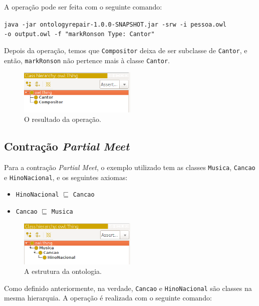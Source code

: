 A operação pode ser feita com o seguinte comando:

\begin{small}
	\texttt{java -jar ontologyrepair-1.0.0-SNAPSHOT.jar -srw -i pessoa.owl \\ -o output.owl -f "markRonson Type: Cantor"}
\end{small}

Depois da operação, temos que \texttt{Compositor} deixa de ser subclasse de \texttt{Cantor}, e então, \texttt{markRonson} não pertence mais à classe \texttt{Cantor}.

\begin{figure}[H]
	\centering
	\includegraphics[width=0.5\textwidth]{Capitulos/Implementacao/srw3.png}
	\caption{O resultado da operação.}
\end{figure}

\subsection{Contração \textit{Partial Meet}}

Para a contração \textit{Partial Meet}, o exemplo utilizado tem as classes \texttt{Musica}, \texttt{Cancao} e \texttt{HinoNacional}, e os seguintes axiomas: 

\begin{itemize}
	\item \texttt{HinoNacional} $ \sqsubseteq $ \texttt{Cancao}
	\item \texttt{Cancao} $ \sqsubseteq $ \texttt{Musica}
\end{itemize}

\begin{figure}[H]
	\centering
	\includegraphics[width=0.5\textwidth]{Capitulos/Implementacao/cpm1.png}
	\caption{A estrutura da ontologia.}
\end{figure}

Como definido anteriormente, na verdade, \texttt{Cancao} e \texttt{HinoNacional} são classes na mesma hierarquia. A operação é realizada com o seguinte comando:

